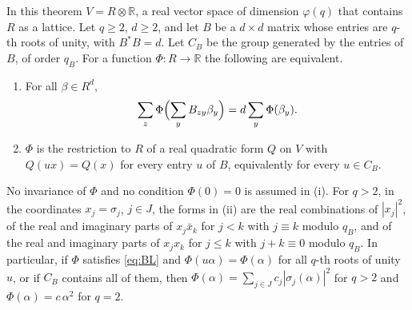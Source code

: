 \begin{theorem}\label{thm:block}
In this theorem $V=R\otimes\mathbb{R}$, a real vector space of dimension $\varphi(q)$ that contains $R$ as a lattice. Let $q\ge2$, $d\ge2$, and let $B$ be a $d\times d$ matrix whose entries are $q$-th roots of unity, with $B^*B=d$. Let $C_B$ be the group generated by the entries of $B$, of order $q_B$. For a function $\Phi\colon R\to\mathbb{R}$ the following are equivalent.
\begin{enumerate}
\item[(i)] For all $\beta\in R^d$,
\begin{equation}\label{eq:BL}
\sum_{z}\Phi\Bigl(\sum_yB_{zy}\beta_y\Bigr)=d\sum_y\Phi(\beta_y).
\end{equation}
\item[(ii)] $\Phi$ is the restriction to $R$ of a real quadratic form $Q$ on $V$ with $Q(ux)=Q(x)$ for every entry $u$ of $B$, equivalently for every $u\in C_B$.
\end{enumerate}
No invariance of $\Phi$ and no condition $\Phi(0)=0$ is assumed in (i). For $q>2$, in the coordinates $x_j=\sigma_j$, $j\in J$, the forms in (ii) are the real combinations of $|x_j|^2$, of the real and imaginary parts of $x_j\bar x_k$ for $j<k$ with $j\equiv k$ modulo $q_B$, and of the real and imaginary parts of $x_jx_k$ for $j\le k$ with $j+k\equiv0$ modulo $q_B$. In particular, if $\Phi$ satisfies \eqref{eq:BL} and $\Phi(u\alpha)=\Phi(\alpha)$ for all $q$-th roots of unity $u$, or if $C_B$ contains all of them, then $\Phi(\alpha)=\sum_{j\in J}c_j|\sigma_j(\alpha)|^2$ for $q>2$ and $\Phi(\alpha)=c\,\alpha^2$ for $q=2$.
\end{theorem}

